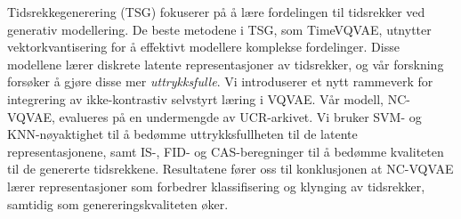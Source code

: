 \documentclass[../../thesis.tex]{subfiles}
\begin{document}
Tidsrekkegenerering (TSG) fokuserer på å lære fordelingen til tidsrekker ved generativ modellering. De beste metodene i TSG, som TimeVQVAE, utnytter vektorkvantisering for å effektivt modellere komplekse fordelinger. Disse modellene lærer diskrete latente representasjoner av tidsrekker, og vår forskning forsøker å gjøre disse mer \textit{uttrykksfulle}. Vi introduserer et nytt rammeverk for integrering av ikke-kontrastiv selvstyrt læring i VQVAE. Vår modell, NC-VQVAE, evalueres på en undermengde av UCR-arkivet. Vi bruker SVM- og KNN-nøyaktighet til å bedømme uttrykksfullheten til de latente representasjonene, samt IS-, FID- og CAS-beregninger til å bedømme kvaliteten til de genererte tidsrekkene. Resultatene fører oss til konklusjonen at NC-VQVAE lærer representasjoner som forbedrer klassifisering og klynging av tidsrekker, samtidig som genereringskvaliteten øker.
\end{document}
